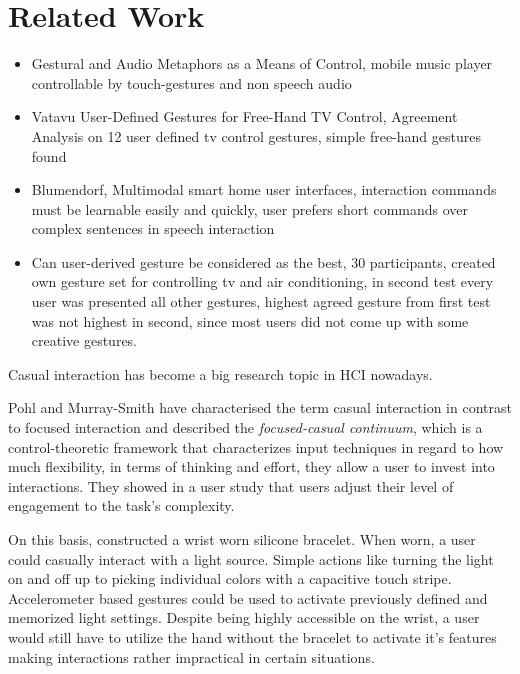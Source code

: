 \chapter{Related Work}\label{ch:relatedwork}

\begin{itemize}

\item{
	Gestural and Audio Metaphors as a Means of Control,
	mobile music player controllable by touch-gestures and non speech audio
}
\item{
	Vatavu User-Defined Gestures for Free-Hand TV Control,
	Agreement Analysis on 12 user defined tv control gestures,
	simple free-hand gestures found
}
\item{
	Blumendorf, Multimodal smart home user interfaces,
	interaction commands must be learnable easily and quickly, user prefers short commands over complex sentences in speech interaction
}
\item{
	Can user-derived gesture be considered as the best,
	30 participants, created own gesture set for controlling tv and air conditioning, in second test every user was presented all other gestures, highest agreed gesture from first test was not highest in second, since most users did not come up with some creative gestures.
}

\end{itemize}

Casual interaction has become a big research topic in \ac{HCI} nowadays.

Pohl and Murray-Smith \cite{pohl2013focused} have characterised the term casual interaction in contrast to focused interaction and described the \textit{focused-casual continuum}, which is a control-theoretic framework that characterizes input techniques in regard to how much flexibility, in terms of thinking and effort, they allow a user to invest into interactions. They showed in a user study that users adjust their level of engagement to the task's complexity.

On this basis, \cite{Busse2014Thesis} constructed a wrist worn silicone bracelet. When worn, a user could casually interact with a light source. Simple actions like turning the light on and off up to picking individual colors with a capacitive touch stripe. Accelerometer based gestures could be used to activate previously defined and memorized light settings. Despite being highly accessible on the wrist, a user would still have to utilize the hand without the bracelet to activate it's features making interactions rather impractical in certain situations.

